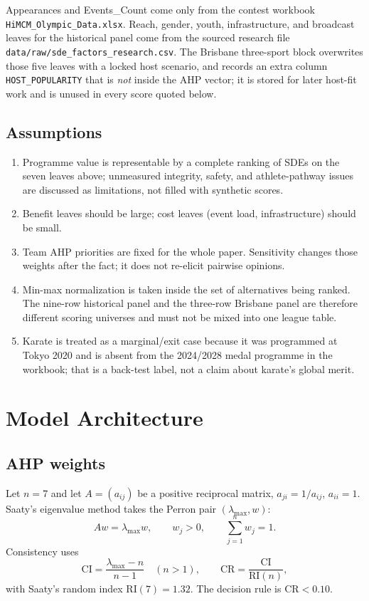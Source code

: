 \documentclass[12pt]{article}
\newcommand{\CR}{\mathrm{CR}}
\newcommand{\CI}{\mathrm{CI}}
\newcommand{\RI}{\mathrm{RI}}
\begin{document}
Appearances and Events\_Count come only from the contest workbook
\texttt{HiMCM\_Olympic\_Data.xlsx}. Reach, gender, youth, infrastructure, and broadcast
leaves for the historical panel come from the sourced research file
\texttt{data/raw/sde\_factors\_research.csv}. The Brisbane three-sport block overwrites
those five leaves with a locked host scenario, and records an extra column
\texttt{HOST\_POPULARITY} that is \emph{not} inside the AHP vector; it is stored for
later host-fit work and is unused in every score quoted below.

\subsection{Assumptions}

\begin{enumerate}
\item Programme value is representable by a complete ranking of SDEs on the seven
      leaves above; unmeasured integrity, safety, and athlete-pathway issues are
      discussed as limitations, not filled with synthetic scores.
\item Benefit leaves should be large; cost leaves (event load, infrastructure) should
      be small.
\item Team AHP priorities are fixed for the whole paper. Sensitivity changes those
      weights after the fact; it does not re-elicit pairwise opinions.
\item Min-max normalization is taken inside the set of alternatives being ranked.
      The nine-row historical panel and the three-row Brisbane panel are therefore
      different scoring universes and must not be mixed into one league table.
\item Karate is treated as a marginal/exit case because it was programmed at Tokyo
      2020 and is absent from the 2024/2028 medal programme in the workbook; that is
      a back-test label, not a claim about karate's global merit.
\end{enumerate}

\section{Model Architecture}
\label{sec:model}

\subsection{AHP weights}

Let \(n=7\) and let \(A=(a_{ij})\) be a positive reciprocal matrix,
\(a_{ji}=1/a_{ij}\), \(a_{ii}=1\). Saaty's eigenvalue method takes the Perron pair
\((\lambda_{\max},w)\):
\begin{equation}
  A w = \lambda_{\max} w,\qquad
  w_j>0,\qquad
  \sum_{j=1}^{n} w_j=1.
\end{equation}
Consistency uses
\begin{equation}
  \CI=\frac{\lambda_{\max}-n}{n-1}\quad (n>1),\qquad
  \CR=\frac{\CI}{\RI(n)},
\end{equation}
with Saaty's random index \(\RI(7)=1.32\). The decision rule is \(\CR<0.10\).
\end{document}
